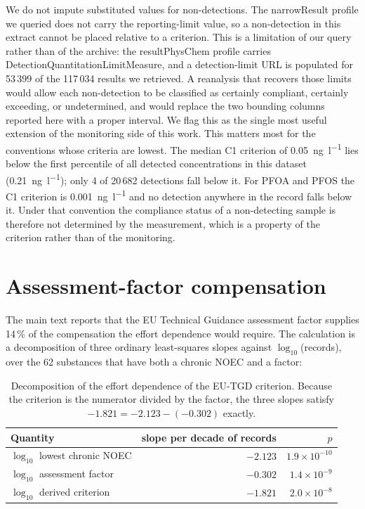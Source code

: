 \documentclass[preprint,11pt]{elsarticle}
\begin{document}
We do not impute substituted values for non-detections. The
\textsf{narrowResult} profile we queried does not carry the reporting-limit
value, so a non-detection in this extract cannot be placed relative to a
criterion. This is a limitation of our query rather than of the archive: the
\textsf{resultPhysChem} profile carries
\textsf{DetectionQuantitationLimitMeasure}, and a detection-limit URL is
populated for 53\,399 of the 117\,034 results we retrieved. A reanalysis that
recovers those limits would allow each non-detection to be classified as
certainly compliant, certainly exceeding, or undetermined, and would replace
the two bounding columns reported here with a proper interval. We flag this as
the single most useful extension of the monitoring side of this work. This matters most for the conventions whose criteria
are lowest. The median C1 criterion of \SI{0.05}{\nano\gram\per\litre} lies
below the first percentile of all detected concentrations in this dataset
(\SI{0.21}{\nano\gram\per\litre}); only 4 of 20\,682 detections fall below
it. For PFOA and PFOS the C1 criterion is \SI{0.001}{\nano\gram\per\litre}
and no detection anywhere in the record falls below it. Under that convention
the compliance status of a non-detecting sample is therefore not determined by
the measurement, which is a property of the criterion rather than of the
monitoring.



\section{Assessment-factor compensation}

The main text reports that the EU Technical Guidance assessment factor supplies
14\,\% of the compensation the effort dependence would require. The calculation
is a decomposition of three ordinary least-squares slopes against
$\log_{10}$(records), over the 62 substances that have both a chronic
\textsf{NOEC} and a factor:

\begin{table}[htbp]
\centering
\caption{Decomposition of the effort dependence of the EU-TGD criterion. Because
the criterion is the numerator divided by the factor, the three slopes satisfy
$-1.821 = -2.123 - (-0.302)$ exactly.}
\label{tab:s5}
\begin{tabular}{@{}l r r@{}}
\toprule
Quantity & slope per decade of records & $p$ \\
\midrule
$\log_{10}$ lowest chronic \textsf{NOEC} & $-2.123$ & $1.9\times10^{-10}$ \\
$\log_{10}$ assessment factor            & $-0.302$ & $1.4\times10^{-9}$ \\
$\log_{10}$ derived criterion            & $-1.821$ & $2.0\times10^{-8}$ \\
\bottomrule
\end{tabular}
\end{table}
\end{document}
